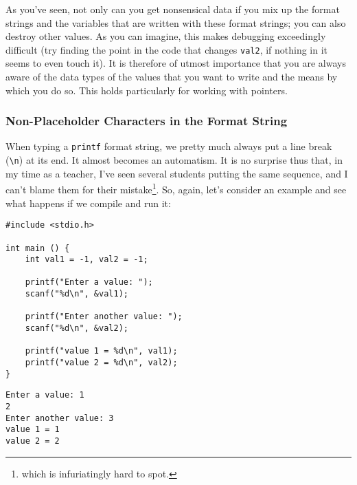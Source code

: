 \begin{hintbox}
As you've seen, not only can you get nonsensical data if you mix up the format strings and the variables that are written with these format strings; you can also destroy other values. As you can imagine, this makes debugging exceedingly difficult (try finding the point in the code that changes \texttt{val2}, if nothing in it seems to even touch it). It is therefore of utmost importance that you are always aware of the data types of the values that you want to write and the means by which you do so. This holds particularly for working with pointers.
\end{hintbox}

\subsubsection{Non-Placeholder Characters in the Format String}
When typing a \texttt{printf} format string, we pretty much always put a line break (\texttt{\textbackslash n}) at its end. It almost becomes an automatism. It is no surprise thus that, in my time as a teacher, I've seen several students putting the same sequence, and I can't blame them for their mistake\footnote{which is infuriatingly hard to spot.}. So, again, let's consider an example and see what happens if we compile and run it:

\begin{tcbraster}[raster columns=2,
                  raster equal height,
                  nobeforeafter,
                  raster column skip=0.2cm]
\begin{warnbox}[linebreakScanf.c, leftupper=7mm]
\begin{verbatim}
#include <stdio.h>

int main () {
    int val1 = -1, val2 = -1;

    printf("Enter a value: ");
    scanf("%d\n", &val1);

    printf("Enter another value: ");
    scanf("%d\n", &val2);

    printf("value 1 = %d\n", val1);
    printf("value 2 = %d\n", val2);
}
\end{verbatim}
\end{warnbox}
%
\begin{cmdbox}
\begin{verbatim}
Enter a value: 1
2
Enter another value: 3
value 1 = 1
value 2 = 2
\end{verbatim}
\end{cmdbox}
\end{tcbraster}

